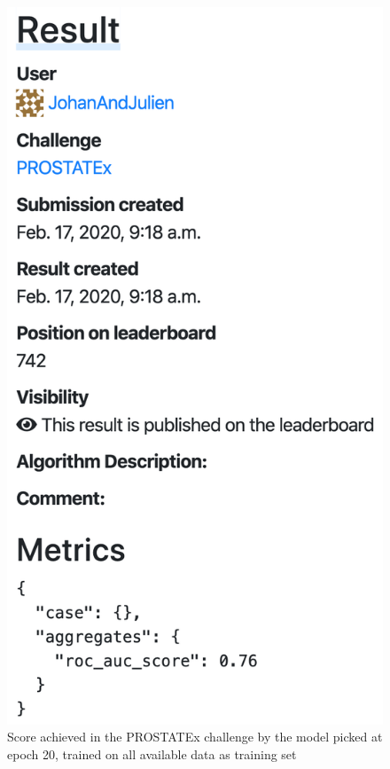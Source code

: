 \begin{figure}[!h]
\centering
\includegraphics[height=0.4\textheight, keepaspectratio=true]{./figures/paper_reproduction_results_challenge2.png}
\caption{Score achieved in the PROSTATEx challenge by the model picked at epoch 20, trained on all available data as training set}
\label{fig:paper_reprodution_results_challenge2}
\end{figure}



